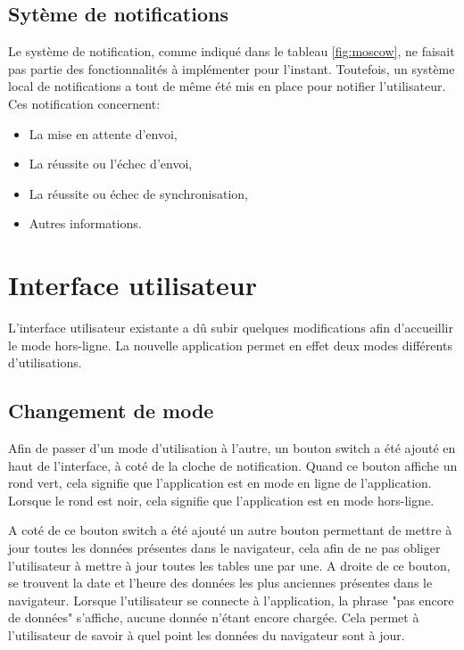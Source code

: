 \documentclass{EPL-master-thesis-covers-FR}
\begin{document}
			\subsection{Sytème de notifications}
				Le système de notification, comme indiqué dans le tableau \ref{fig:moscow}, ne faisait pas partie des fonctionnalités à implémenter pour l'instant. Toutefois, un système local de notifications a tout de même été mis en place pour notifier l'utilisateur. Ces notification concernent:
				
				\begin{itemize}
					\item La mise en attente d'envoi,
					\item La réussite ou l'échec d'envoi,
					\item La réussite ou échec de synchronisation,
					\item Autres informations.
				\end{itemize}								
				
		
		\section{Interface utilisateur}
			L'interface utilisateur existante a dû subir quelques modifications afin d'accueillir le mode hors-ligne. La nouvelle application permet en effet deux modes différents d'utilisations.
			
			\subsection{Changement de mode}
				Afin de passer d'un mode d'utilisation à l'autre, un bouton switch a été ajouté en haut de l'interface, à coté de la cloche de notification. Quand ce bouton affiche un rond vert, cela signifie que l'application est en mode en ligne de l'application. Lorsque le rond est noir, cela signifie que l'application est en mode hors-ligne.
				
				 A coté de ce bouton switch a été ajouté un autre bouton permettant de mettre à jour toutes les données présentes dans le navigateur, cela afin de ne pas obliger l'utilisateur à mettre à jour toutes les tables une par une. A droite de ce bouton, se trouvent la date et l'heure des données les plus anciennes présentes dans le navigateur. Lorsque l'utilisateur se connecte à l'application, la phrase "pas encore de données" s'affiche, aucune donnée n'étant encore chargée. Cela permet à l'utilisateur de savoir à quel point les données du navigateur sont à jour.
				
\end{document}
